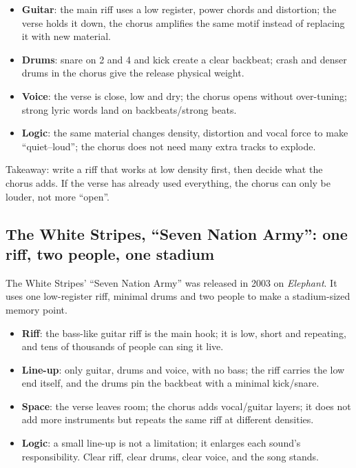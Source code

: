 \begin{itemize}
\item \textbf{Guitar}: the main riff uses a low register, power chords and distortion; the verse holds it down, the chorus amplifies the same motif instead of replacing it with new material.
\item \textbf{Drums}: snare on 2 and 4 and kick create a clear backbeat; crash and denser drums in the chorus give the release physical weight.
\item \textbf{Voice}: the verse is close, low and dry; the chorus opens without over-tuning; strong lyric words land on backbeats/strong beats.
\item \textbf{Logic}: the same material changes density, distortion and vocal force to make ``quiet--loud''; the chorus does not need many extra tracks to explode.
\end{itemize}

Takeaway: write a riff that works at low density first, then decide what the chorus adds. If the verse has already used everything, the chorus can only be louder, not more ``open''.

\subsection{The White Stripes, ``Seven Nation Army'': one riff, two people, one stadium}
\label{sec:rock-case-seven-nation}

The White Stripes' ``Seven Nation Army'' was released in 2003 on \emph{Elephant}. It uses one low-register riff, minimal drums and two people to make a stadium-sized memory point.

\begin{itemize}
\item \textbf{Riff}: the bass-like guitar riff is the main hook; it is low, short and repeating, and tens of thousands of people can sing it live.
\item \textbf{Line-up}: only guitar, drums and voice, with no bass; the riff carries the low end itself, and the drums pin the backbeat with a minimal kick/snare.
\item \textbf{Space}: the verse leaves room; the chorus adds vocal/guitar layers; it does not add more instruments but repeats the same riff at different densities.
\item \textbf{Logic}: a small line-up is not a limitation; it enlarges each sound's responsibility. Clear riff, clear drums, clear voice, and the song stands.
\end{itemize}

